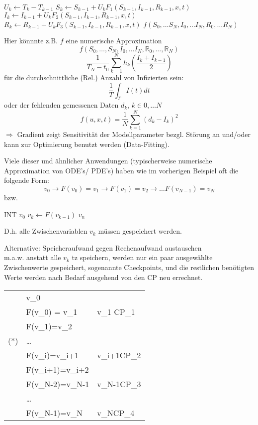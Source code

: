 \begin{algorithmic}
		\State $U_k \gets T_k-T_{k-1}$
		\State $S_k \gets S_{k-1} + U_kF_1(S_{k-1},I_{k-1},R_{k-1},x,t)$
		\State $I_k \gets I_{k-1} + U_kF_2(S_{k-1},I_{k-1},R_{k-1},x,t)$
		\State $R_k \gets R_{k-1} + U_kF_3(S_{k-1},I_{k-1},R_{k-1},x,t)$
	\EndFor
	\State \Return $f(S_0,\dots S_N,I_0,\dots I_N, R_0,\dots R_N)$
\end{algorithmic}

Hier könnnte z.B. $f$ eine numerische Approximation 
$$f(S_0,\dots,S_N,I_0,\dots I_N,\mathbb{R}_0,\dots,\mathbb{R}_N)$$
$$ \frac{1}{T_N-t_0}\sum_{k=1}^N h_k(\frac{I_k+I_{k-1}}{2})$$
für die durchschnittliche (Rel.) Anzahl von Infizierten sein:
$$\frac{1}{T}\int_TI(t)dt$$
oder der fehlenden gemessenen Daten $d_{k}$, $k \in 0,\dots N$
$$f(u,x,t) = \frac{1}{N}\sum_{k=1}^N(d_k-I_k)^2$$
$\Rightarrow$ Gradient zeigt Sensitivität der Modellparameter bezgl. Störung an und/oder kann zur Optimierung benutzt werden (Data-Fitting).

\noindent\makebox[\linewidth]{\rule{\paperwidth}{0.4pt}}
Viele dieser und ähnlicher Anwendungen (typischerweise numerische Approximation von ODE's/ PDE's) haben wie im vorherigen Beispiel oft die folgende Form:
$$v_0 \rightarrow F(v_0) = v_1 \rightarrow F(v_1)=v_2 \rightarrow \dots F(v_{N-1})=v_N$$
bzw.
\begin{algorithmic}
	\State INT $v_0$
		\State $v_k \gets F(v_{k-1})$
	\EndFor
	\State \Return $v_n$
\end{algorithmic}

D.h. alle Zwischenvariablen $v_k$ müssen gespeichert werden.

Alternative: \glqq Speicheraufwand gegen Rechenaufwand austauschen \grqq\\
m.a.w. anstatt alle $v_k$ tz speichern, werden nur ein paar ausgewählte Zwischenwerte gespeichert, sogenannte Checkpoints, und die restlichen benötigten Werte werden nach Bedarf ausgehend von den CP neu errechnet.

\begin{tabular}{L L | L}
	&v_0 &\\
	&\rightarrow F(v_0) = v_1 &v_1 \hat{=}CP_1\\
	&\rightarrow F(v_1)=v_2 &\\
	(*)&\rightarrow \dots &\\
	&\rightarrow F(v_i)=v_{i+1} &v_{i+1}\hat{=}CP_2\\
	&\rightarrow F(v_{i+1})=v_{i+2} &\\
	&\rightarrow F(v_{N-2})=v_{N-1}&v_{N-1}\hat{=}CP_3\\
	&\rightarrow \dots &\\
	&\rightarrow F(v_{N-1})=v_N& v_N\hat{=}CP_4
\end{tabular}
\newpage
